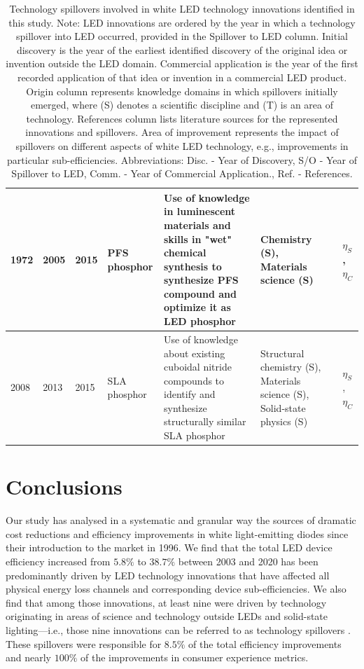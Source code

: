 \documentclass[twoside,twocolumn,9pt]{article}
\begin{document}
\begin{table}[h]
\begin{tabularx}{\textwidth}{|l|l|l|X|X|X|l|X|}
        1972 & 2005 & 2015 & PFS phosphor & Use of knowledge in luminescent materials and skills in "wet" chemical synthesis to synthesize PFS compound and optimize it as LED phosphor & Chemistry (S), Materials science (S) &\cite{paulusz1973efficient}\cite{radkov2009red}\cite{Murphy2015} & $\eta_S$, $\eta_C$ \\ \hline
        2008 & 2013 & 2015 & SLA phosphor & Use of knowledge about existing cuboidal nitride compounds to identify and synthesize structurally similar SLA phosphor & Structural chemistry (S), Materials science (S), Solid-state physics (S) &\cite{Park2008New}\cite{schmidt2013new}\cite{Pust2014} & $\eta_S$, $\eta_C$ \\ \hline
    \end{tabularx}
    \caption{Technology spillovers involved in white LED technology innovations identified in this study. Note: LED innovations are ordered by the year in which a technology spillover into LED occurred, provided in the Spillover to LED column. Initial discovery is the year of the earliest identified discovery of the original idea or invention outside the LED domain. Commercial application is the year of the first recorded application of that idea or invention in a commercial LED product. Origin column represents knowledge domains in which spillovers initially emerged, where (S) denotes a scientific discipline and (T) is an area of technology. References column lists literature sources for the represented innovations and spillovers. Area of improvement represents the impact of spillovers on different aspects of white LED technology, e.g., improvements in particular sub-efficiencies. Abbreviations: Disc. - Year of Discovery, S/O - Year of Spillover to LED, Comm. - Year of Commercial Application., Ref. - References.}
    \label{tab:spillovers}
\end{table}

\section{Conclusions}
Our study has analysed in a systematic and granular way the sources of dramatic cost reductions and efficiency improvements in white light-emitting diodes since their introduction to the market in 1996. We find that the total LED device efficiency increased from $5.8\%$ to $38.7\%$ between 2003 and 2020 has been predominantly driven by LED technology innovations that have affected all physical energy loss channels and corresponding device sub-efficiencies. We also find that among those innovations, at least nine were driven by technology originating in areas of science and technology outside LEDs and solid-state lighting—i.e., those nine innovations can be referred to as technology spillovers . These spillovers were responsible for $8.5\%$ of the total efficiency improvements and nearly $100\%$ of the improvements in consumer experience metrics. 
\end{document}
